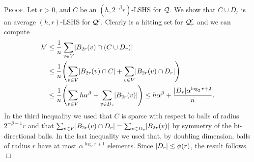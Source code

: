 \documentclass[opre,nonblindrev]{informs3} %
\renewenvironment{proof}[1][\textsc{Proof.}]{#1 }{\hfill $\Box$}
\begin{document}
\begin{proof}
Let $r>0$, and $C$ be an $(h,2^{-\beta}r)$-LSHS for $\mathcal{Q}$.
We show that $C\cup D_r$ is an average $(h,r)$-LSHS for $\mathcal{Q}'$.
Clearly is a hitting set for $\mathcal{Q}'_r$ and we can compute
\begin{align*}
h'&\leq \frac{1}{n}\sum_{v\in V} \abs{B_{2r}(v)\cap (C\cup D_r)}\\
&\leq \frac{1}{n}\prn*{\sum_{v\in V} \abs{B_{2r}(v)\cap C}+\sum_{v\in V} \abs{B_{2r}(v)\cap D_r}}\\
&\leq \frac{1}{n}\prn*{\sum_{v\in V} h\alpha^\beta+\sum_{v\in D_r} \abs{B_{2r}(v)}}
\leq h\alpha^\beta + \frac{\abs{D_r}\alpha^{\log_2r+2}}{n}.
\end{align*}
In the third inequality we used that $C$ is sparse with respect to balls of radius $2^{-\beta+1}r$ and that $\sum_{v\in V} \lvert B_{2r}(v)\cap D_r\rvert=\sum_{v\in D_r} \lvert B_{2r}(v)\rvert$ by symmetry of the bi-directional balls.
In the last inequality we used that, by doubling dimension, balls of radius $r$ have at most $\alpha^{\log_2r+1}$ elements.
Since $\lvert D_r\rvert\leq \phi(r)$, the result follows.
\end{proof}
\end{document}
